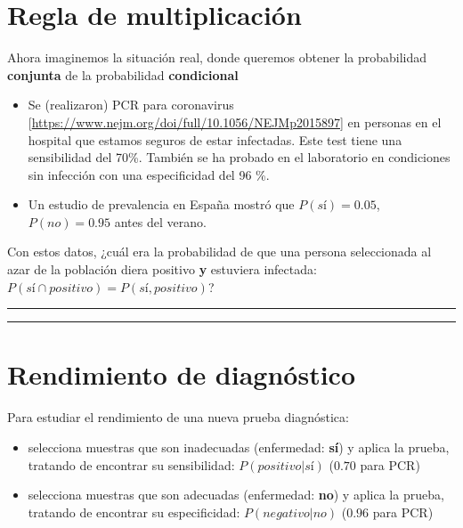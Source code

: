 \documentclass[
]{book}
\begin{document}
\hypertarget{regla-de-multiplicaciuxf3n}{%
\section{Regla de multiplicación}\label{regla-de-multiplicaciuxf3n}}

Ahora imaginemos la situación real, donde queremos obtener la probabilidad \textbf{conjunta} de la probabilidad \textbf{condicional}

\begin{itemize}
\item
  Se (realizaron) PCR para coronavirus {[}\url{https://www.nejm.org/doi/full/10.1056/NEJMp2015897}{]} en personas en el hospital que estamos seguros de estar infectadas. Este test tiene una sensibilidad del 70\%. También se ha probado en el laboratorio en condiciones sin infección con una especificidad del 96 \%.
\item
  Un estudio de prevalencia en España mostró que \(P(sí)=0.05\), \(P(no)=0.95\) antes del verano.
\end{itemize}

Con estos datos, ¿cuál era la probabilidad de que una persona seleccionada al azar de la población diera positivo \textbf{y} estuviera infectada: \(P(sí \cap positivo)=P(sí, positivo)\)?

\begin{center}\rule{0.5\linewidth}{0.5pt}\end{center}

\begin{center}\rule{0.5\linewidth}{0.5pt}\end{center}

\hypertarget{rendimiento-de-diagnuxf3stico}{%
\section{Rendimiento de diagnóstico}\label{rendimiento-de-diagnuxf3stico}}

Para estudiar el rendimiento de una nueva prueba diagnóstica:

\begin{itemize}
\item
  selecciona muestras que son inadecuadas (enfermedad: \textbf{sí}) y aplica la prueba, tratando de encontrar su sensibilidad: \(P(positivo|sí)\) (\(0.70\) para PCR)
\item
  selecciona muestras que son adecuadas (enfermedad: \textbf{no}) y aplica la prueba, tratando de encontrar su especificidad: \(P(negativo|no)\) (\(0.96\) para PCR)
\end{itemize}
\end{document}
